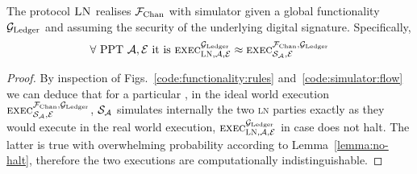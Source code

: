 \begin{theorem}
  The protocol $\textsc{LN}$ realises $\mathcal{F}_{\mathrm{Chan}}$ with simulator \simulator given a
  global functionality $\mathcal{G}_{\mathrm{Ledger}}$ and assuming the security of the underlying
  digital signature. Specifically,
  \begin{gather*}
    \forall \text{ PPT } \mathcal{A}, \mathcal{E} \text{ it is }
    \textsc{exec}^{\mathcal{G}_{\mathrm{Ledger}}}_{\textsc{LN}, \mathcal{A}, \mathcal{E}} \approx
    \textsc{exec}^{\mathcal{F}_{\mathrm{Chan}}, \mathcal{G}_{\mathrm{Ledger}}}_{\mathcal{S}_{\mathcal{A}}, \mathcal{E}}
  \end{gather*}
\end{theorem}

\begin{proof}
  By inspection of Figs.~\ref{code:functionality:rules}
  and~\ref{code:simulator:flow} we can deduce that for a particular
  \environment, in the ideal world execution $\textsc{exec}^{\mathcal{F}_{\mathrm{Chan}},
  \mathcal{G}_{\mathrm{Ledger}}}_{\mathcal{S}_{\mathcal{A}}, \mathcal{E}}$, $\mathcal{S}_{\mathcal{A}}$
  simulates internally the two \textsc{ln} parties exactly as they would execute
  in the real world execution, $\textsc{exec}^{\mathcal{G}_{\mathrm{Ledger}}}_{\textsc{LN},
  \mathcal{A}, \mathcal{E}}$ in case \fchan does not halt. The latter is true
  with overwhelming probability according to Lemma~\ref{lemma:no-halt},
  therefore the two executions are computationally indistinguishable.
\end{proof}
